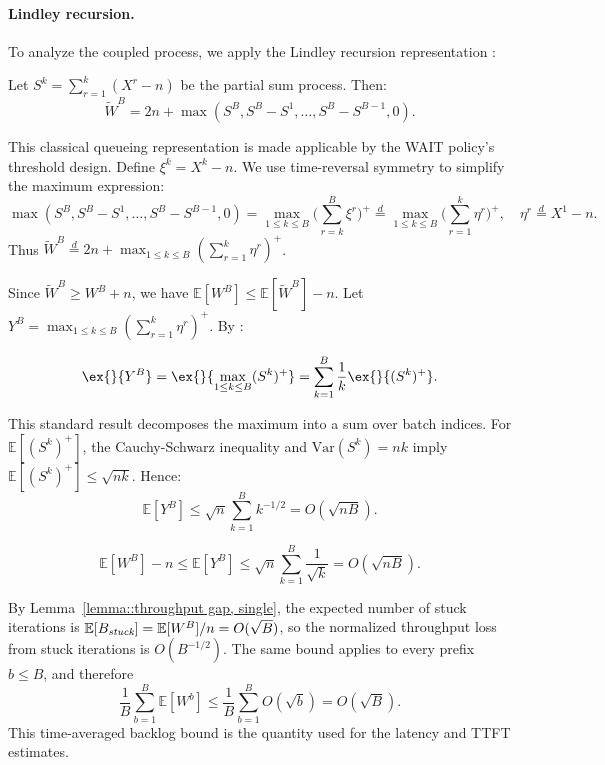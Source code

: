 \paragraph{Lindley recursion.} To analyze the coupled process, we apply the Lindley recursion representation \citep[Proposition 6.3]{asmussen2003applied}:
\begin{lemma}\label{lem:lindley_rep}
Let \(S^k=\sum_{r=1}^k (X^r-n)\) be the partial sum process. Then:
$$\tilde{W}^B=2n+\max(S^B, S^B-S^1,\ldots,S^B-S^{B-1},0).$$
\end{lemma}
\noindent This classical queueing representation is made applicable by the WAIT policy's threshold design. Define \(\xi^k = X^k-n\). We use time-reversal symmetry to simplify the maximum expression:
$$\max(S^B, S^B-S^1,\ldots,S^B-S^{B-1},0)=\max_{1\leq k\leq B}\Big(\sum_{r=k}^{B}\xi^r\Big)^+\overset{d}{=}\max_{1\leq k\leq B}\Big(\sum_{r=1}^{k}\eta^r\Big)^+, \quad \eta^r\overset{d}{=}X^1-n.$$
Thus \(\tilde{W}^B \overset{d}{=}2n+\max_{1\leq k\leq B}(\sum_{r=1}^{k}\eta^r)^+\).

Since \(\tilde{W}^B \geq W^B + n\), we have \(\mathbb{E}[W^B]\leq \mathbb{E}[\tilde{W}^B]-n\). Let \(Y^B = \max_{1\leq k\leq B}(\sum_{r=1}^{k}\eta^r)^+\). By \cite[Lemma 2]{strait1974maximum}:
\begin{lemma}\label{lem:Y_T}
$$\ex{}{Y^B}=\ex{}{\max_{1\leq k\leq B}(S^k)^+}=\sum_{k=1}^B \frac{1}{k}\ex{}{(S^k)^+}.$$
\end{lemma}
\noindent This standard result \citep{strait1974maximum} decomposes the maximum into a sum over batch indices. For \(\mathbb{E}[(S^k)^+]\), the Cauchy-Schwarz inequality and \(\mathrm{Var}(S^k)=nk\) imply \(\mathbb{E}[(S^k)^+] \leq \sqrt{nk}\). Hence:
$$\mathbb{E}[Y^B] \leq \sqrt{n} \sum_{k=1}^B k^{-1/2}=O(\sqrt{nB}).$$

\begin{lemma}\label{lemma::throughput gap}
$$\mathbb{E}[W^B]-n\leq \mathbb{E}[Y^B]\leq  \sqrt{n} \sum_{k=1}^B \frac{1}{\sqrt{k}}=O(\sqrt{nB}).$$
\end{lemma}
\noindent By Lemma~\ref{lemma::throughput gap, single}, the expected number of stuck iterations is \(\mathbb{E}[B_{\emph{stuck}}]=\mathbb{E}[W^B]/n=O(\sqrt{B})\), so the normalized throughput loss from stuck iterations is \(O(B^{-1/2})\). The same bound applies to every prefix \(b\le B\), and therefore
\[
    \frac{1}{B}\sum_{b=1}^B \mathbb{E}[W^b] \leq \frac{1}{B}\sum_{b=1}^B O(\sqrt{b}) = O(\sqrt{B}).
\]
This time-averaged backlog bound is the quantity used for the latency and TTFT estimates.

